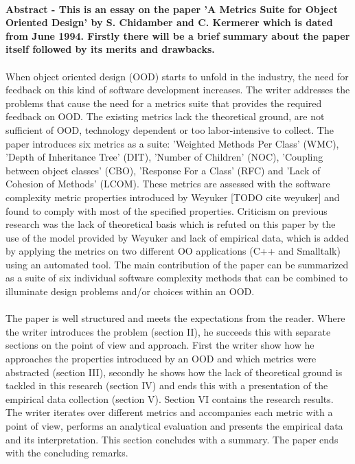 \paragraph{}
\textbf{
Abstract - This is an essay on the paper 'A Metrics Suite for Object Oriented Design' by S. Chidamber and C.
Kermerer which is dated from June 1994. Firstly there will be a brief summary about the paper itself followed by
its merits and drawbacks.
}

\paragraph{}
When object oriented design (OOD) starts to unfold in the industry, the need for feedback on this kind of software
development increases. The writer addresses the problems that cause the need for a metrics suite that provides the
required feedback on OOD. The existing metrics lack the theoretical ground, are not sufficient of OOD,
technology dependent or too labor-intensive to collect.
The paper introduces six metrics as a suite: 'Weighted Methods Per Class' (WMC), 'Depth of Inheritance Tree' (DIT),
'Number of Children' (NOC), 'Coupling between object classes' (CBO), 'Response For a Class' (RFC) and 'Lack of
Cohesion of Methods' (LCOM). These metrics are assessed with the software complexity metric properties introduced by
Weyuker [TODO cite weyuker] and found to comply with most of the specified properties.
Criticism on previous research was the lack of theoretical basis which is refuted on this paper by the use of the
model provided by Weyuker and lack of empirical data, which is added by applying the metrics on two different OO
applications (C++ and Smalltalk) using an automated tool. The main contribution of the paper can be summarized as a
suite of six individual software complexity methods that can be combined to illuminate design problems and/or choices
within an OOD.

\paragraph{}
The paper is well structured and meets the expectations from the reader. Where the writer introduces the problem
(section II), he succeeds this with separate sections on the point of view and approach. First the writer show how he
approaches the properties introduced by an OOD and which metrics were abstracted (section III), secondly he shows how the
lack of theoretical ground is tackled in this research (section IV) and ends this with a presentation of the empirical
data collection (section V). Section VI contains the research results. The writer iterates over different metrics and
accompanies each metric with a point of view, performs an analytical evaluation and presents the empirical data and its
interpretation. This section concludes with a summary. The paper ends with the concluding remarks.

